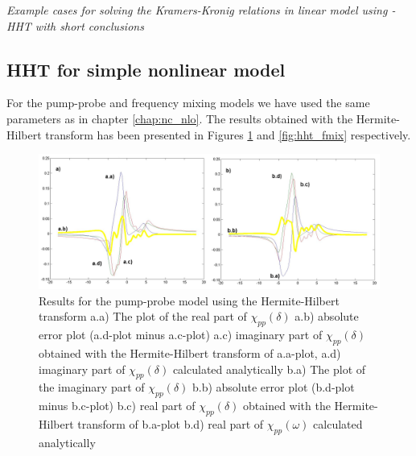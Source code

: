 \documentclass[12pt,twoside,a4paper]{article}
\numberwithin{equation}{subsection}
\numberwithin{figure}{subsection}
\begin{document}
\textit{Example cases for solving the Kramers-Kronig relations in linear model using - HHT with short conclusions}

\subsection{HHT for simple nonlinear model} \label{chap:hermite_nlo}

For the pump-probe and frequency mixing models we have used the same parameters as in chapter \ref{chap:nc_nlo}. The results
obtained with the Hermite-Hilbert transform has been presented in Figures \ref{fig:hht_pnp} and \ref{fig:hht_fmix}
respectively.

\begin{figure} 
  \includegraphics[width=150mm]{img/hht_pnp.png}
  \caption{Results for the pump-probe model using the Hermite-Hilbert transform
     a.a) The plot of the real part of ${\chi_{pp}}(\delta )$
     a.b) absolute error plot (a.d-plot minus a.c-plot)
     a.c) imaginary part of ${\chi_{pp}}(\delta )$ obtained with the Hermite-Hilbert transform of a.a-plot, 
     a.d) imaginary part of ${\chi_{pp}}(\delta )$ calculated analytically 
     b.a) The plot of the imaginary part of ${\chi_{pp}}(\delta )$ 
     b.b) absolute error plot (b.d-plot minus b.c-plot)
     b.c) real part of ${\chi_{pp}}(\delta )$ obtained with the Hermite-Hilbert transform of b.a-plot 
     b.d) real part of $\chi_{pp} (\omega )$ calculated analytically 
     \label{fig:hht_pnp}
     }
\end{figure} 
\end{document}
